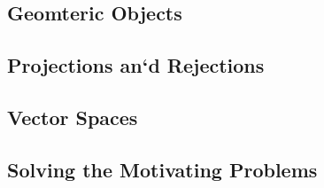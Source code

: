 \subsection{Geomteric Objects} %

\subsection{Projections an`d Rejections} %

\subsection{Vector Spaces} %

\subsection{Solving the Motivating Problems}
